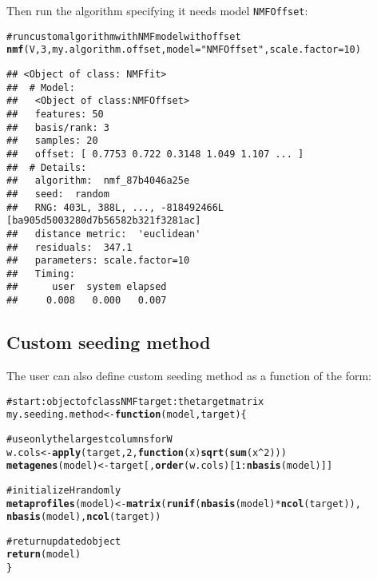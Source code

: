 \documentclass[a4paper]{article}\usepackage{graphicx, color}
\makeatletter
\newcommand{\hlfunctioncall}[1]{\textcolor[rgb]{0.501960784313725,0,0.329411764705882}{\textbf{#1}}}%
\newcommand{\hlstring}[1]{\textcolor[rgb]{0.6,0.6,1}{#1}}%
\newcommand{\hlcomment}[1]{\textcolor[rgb]{0.180392156862745,0.6,0.341176470588235}{#1}}%
\newenvironment{kframe}{%
 \def\at@end@of@kframe{}%
 \ifinner\ifhmode%
  \def\at@end@of@kframe{\end{minipage}}%
  \begin{minipage}{\columnwidth}%
 \fi\fi%
 \def\FrameCommand##1{\hskip\@totalleftmargin \hskip-\fboxsep
 \colorbox{shadecolor}{##1}\hskip-\fboxsep
     \hskip-\linewidth \hskip-\@totalleftmargin \hskip\columnwidth}%
 \MakeFramed {\advance\hsize-\width
   \@totalleftmargin\z@ \linewidth\hsize
   \@setminipage}}%
 {\par\unskip\endMakeFramed%
 \at@end@of@kframe}
\newenvironment{knitrout}{}{} %
\let\code=\texttt
\makeatother
\begin{document}
Then run the algorithm specifying it needs model \code{NMFOffset}:
\begin{knitrout}
\color{fgcolor}\begin{kframe}
\begin{alltt}
\hlcomment{# run custom algorithm with NMF model with offset}
\hlfunctioncall{nmf}(V, 3, my.algorithm.offset, model = \hlstring{"NMFOffset"}, scale.factor = 10)
\end{alltt}
\begin{verbatim}
## <Object of class: NMFfit>
##  # Model:
##   <Object of class:NMFOffset>
##   features: 50 
##   basis/rank: 3 
##   samples: 20 
##   offset: [ 0.7753 0.722 0.3148 1.049 1.107 ... ]
##  # Details:
##   algorithm:  nmf_87b4046a25e 
##   seed:  random 
##   RNG: 403L, 388L, ..., -818492466L [ba905d5003280d7b56582b321f3281ac]
##   distance metric:  'euclidean' 
##   residuals:  347.1 
##   parameters: scale.factor=10 
##   Timing:
##      user  system elapsed 
##     0.008   0.000   0.007
\end{verbatim}
\end{kframe}
\end{knitrout}



\subsection{Custom seeding method}\label{sec:seed_custom}

The user can also define custom seeding method as a function of the form:


\begin{knitrout}
\color{fgcolor}\begin{kframe}
\begin{alltt}

\hlcomment{# start: object of class NMF target: the target matrix}
my.seeding.method <- \hlfunctioncall{function}(model, target) \{
    
\hlcomment{    # use only the largest columns for W}
    w.cols <- \hlfunctioncall{apply}(target, 2, \hlfunctioncall{function}(x) \hlfunctioncall{sqrt}(\hlfunctioncall{sum}(x^2)))
    \hlfunctioncall{metagenes}(model) <- target[, \hlfunctioncall{order}(w.cols)[1:\hlfunctioncall{nbasis}(model)]]
    
\hlcomment{    # initialize H randomly}
    \hlfunctioncall{metaprofiles}(model) <- \hlfunctioncall{matrix}(\hlfunctioncall{runif}(\hlfunctioncall{nbasis}(model) * \hlfunctioncall{ncol}(target)), 
        \hlfunctioncall{nbasis}(model), \hlfunctioncall{ncol}(target))
    
\hlcomment{    # return updated object}
    \hlfunctioncall{return}(model)
\}
\end{alltt}
\end{kframe}
\end{knitrout}
\end{document}
